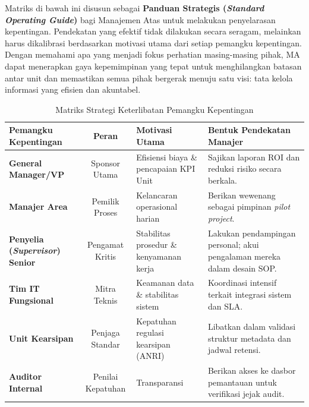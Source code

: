 \documentclass[12pt,a4paper]{report}
\begin{document}
Matriks di bawah ini disusun sebagai \textbf{Panduan Strategis (\textit{Standard Operating Guide})} bagi Manajemen Atas untuk melakukan penyelarasan kepentingan. Pendekatan yang efektif tidak dilakukan secara seragam, melainkan harus dikalibrasi berdasarkan motivasi utama dari setiap pemangku kepentingan. Dengan memahami apa yang menjadi fokus perhatian masing-masing pihak, MA dapat menerapkan gaya kepemimpinan yang tepat untuk menghilangkan batasan antar unit dan memastikan semua pihak bergerak menuju satu visi: tata kelola informasi yang efisien dan akuntabel.

\begin{table}[htbp]
\centering
\small
\caption{Matriks Strategi Keterlibatan Pemangku Kepentingan}
\begin{tabularx}{\textwidth}{@{} >{\raggedright\arraybackslash}X c >{\raggedright\arraybackslash}X >{\raggedright\arraybackslash}X @{}}
\toprule
\textbf{Pemangku Kepentingan} & \textbf{Peran} & \textbf{Motivasi Utama} & \textbf{Bentuk Pendekatan Manajer} \\
\midrule
\textbf{General Manager/VP} & Sponsor Utama & Efisiensi biaya \& pencapaian KPI Unit & Sajikan laporan ROI dan reduksi risiko secara berkala. \\
\textbf{Manajer Area} & Pemilik Proses & Kelancaran operasional harian & Berikan wewenang sebagai pimpinan \textit{pilot project}. \\
\textbf{Penyelia (\textit{Supervisor}) Senior} & Pengamat Kritis & Stabilitas prosedur \& kenyamanan kerja & Lakukan pendampingan personal; akui pengalaman mereka dalam desain SOP. \\
\textbf{Tim IT Fungsional} & Mitra Teknis & Keamanan data \& stabilitas sistem & Koordinasi intensif terkait integrasi sistem dan SLA. \\
\textbf{Unit Kearsipan} & Penjaga Standar & Kepatuhan regulasi kearsipan (ANRI) & Libatkan dalam validasi struktur metadata dan jadwal retensi. \\
\textbf{Auditor Internal} & Penilai Kepatuhan & Transparansi & Berikan akses ke dasbor pemantauan untuk verifikasi jejak audit. \\
\bottomrule
\end{tabularx}
\end{table}
\end{document}
